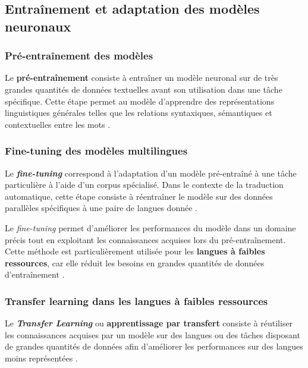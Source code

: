 \subsection{Entraînement et adaptation des modèles neuronaux}

\subsubsection{Pré-entraînement des modèles}

Le \textbf{pré-entraînement} consiste à entraîner un modèle neuronal sur de très grandes quantités de données textuelles avant son utilisation dans une tâche spécifique. Cette étape permet au modèle d'apprendre des représentations linguistiques générales telles que les relations syntaxiques, sémantiques et contextuelles entre les mots \cite{Goodfellow-et-al-2016, ranathunga2023neural}.

\subsubsection{Fine-tuning des modèles multilingues}

Le \textbf{\textit{fine-tuning}} correspond à l'adaptation d'un modèle pré-entraîné à une tâche particulière à l'aide d'un corpus spécialisé. Dans le contexte de la traduction automatique, cette étape consiste à réentraîner le modèle sur des données parallèles spécifiques à une paire de langues donnée \cite{rakhimov2024enhancing}.

Le \textit{fine-tuning} permet d'améliorer les performances du modèle dans un domaine précis tout en exploitant les connaissances acquises lors du pré-entraînement. Cette méthode est particulièrement utilisée pour les \textbf{langues à faibles ressources}, car elle réduit les besoins en grandes quantités de données d'entraînement \cite{ma2025dongba}.

\subsubsection{Transfer learning dans les langues à faibles ressources}

Le \textbf{\textit{Transfer Learning}} ou \textbf{apprentissage par transfert} consiste à réutiliser les connaissances acquises par un modèle sur des langues ou des tâches disposant de grandes quantités de données afin d'améliorer les performances sur des langues moins représentées \cite{nguyen2017transfer, lalrempuii2023investigating}.

